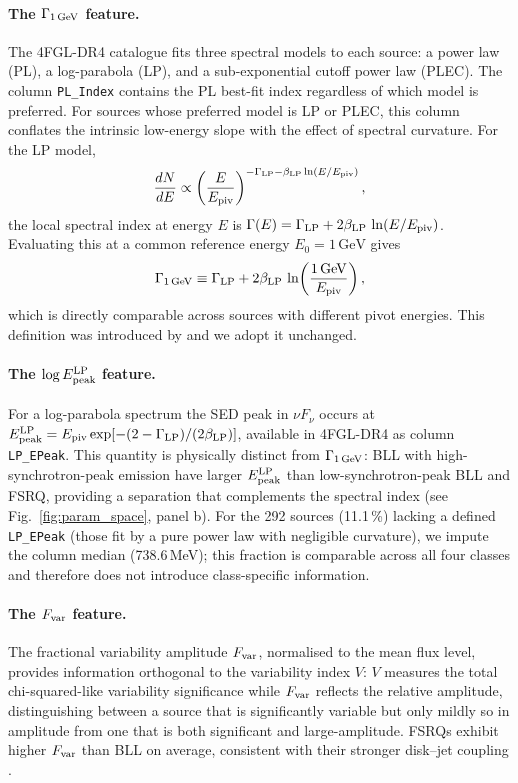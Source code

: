 \documentclass[fleqn,12pt]{article}
\newcommand{\fgl}{4FGL-DR4}
\newcommand{\GamLP}{\Gamma_{\rm 1\,GeV}}
\newcommand{\betaLP}{\beta_{\rm LP}}
\newcommand{\Epeak}{E^{\rm LP}_{\rm peak}}
\newcommand{\Fvar}{F_{\rm var}}
\begin{document}
\paragraph{The $\GamLP$ feature.}
The \fgl{} catalogue fits three spectral models to each source: a
power law (PL), a log-parabola (LP), and a sub-exponential cutoff
power law (PLEC). The column \texttt{PL\_Index} contains the PL
best-fit index regardless of which model is preferred. For sources
whose preferred model is LP or PLEC, this column conflates the
intrinsic low-energy slope with the effect of spectral curvature. For
the LP model,
\begin{equation}
  \frac{dN}{dE} \propto
  \left(\frac{E}{E_{\rm piv}}\right)^{-\Gamma_{\rm LP}
    - \betaLP\ln(E/E_{\rm piv})} ,
  \label{eq:lp}
\end{equation}
the local spectral index at energy $E$ is
$\Gamma(E) = \Gamma_{\rm LP} + 2\betaLP\,\ln(E/E_{\rm piv})$.
Evaluating this at a common reference energy $E_0 = 1\,\text{GeV}$
gives
\begin{equation}
  \GamLP \equiv \Gamma_{\rm LP}
    + 2\betaLP\,\ln\!\left(\frac{1\,\text{GeV}}{E_{\rm piv}}\right) ,
  \label{eq:gamma1gev}
\end{equation}
which is directly comparable across sources with different pivot
energies. This definition was introduced by \citet{Malyshev2023} and
we adopt it unchanged.

\paragraph{The $\log\Epeak$ feature.}
For a log-parabola spectrum the SED peak in $\nu F_\nu$ occurs at
$\Epeak = E_{\rm piv}\exp[-(2-\Gamma_{\rm LP})/(2\betaLP)]$,
available in \fgl{} as column \texttt{LP\_EPeak}. This quantity is
physically distinct from $\GamLP$: BLL with high-synchrotron-peak
emission have larger $\Epeak$ than low-synchrotron-peak BLL and FSRQ,
providing a separation that complements the spectral index
(see Fig.~\ref{fig:param_space}, panel b). For the 292 sources
(11.1\,\%) lacking a defined \texttt{LP\_EPeak} (those fit by a pure
power law with negligible curvature), we impute the column median
(738.6\,MeV); this fraction is comparable across all four classes
and therefore does not introduce class-specific information.

\paragraph{The $\Fvar$ feature.}
The fractional variability amplitude $\Fvar$, normalised to the mean
flux level, provides information orthogonal to the variability index
$V$: $V$ measures the total chi-squared-like variability significance
while $\Fvar$ reflects the relative amplitude, distinguishing between
a source that is significantly variable but only mildly so in
amplitude from one that is both significant and large-amplitude. FSRQs
exhibit higher $\Fvar$ than BLL on average, consistent with their
stronger disk--jet coupling \citep{Abdo2010_3LAC}.
\end{document}
